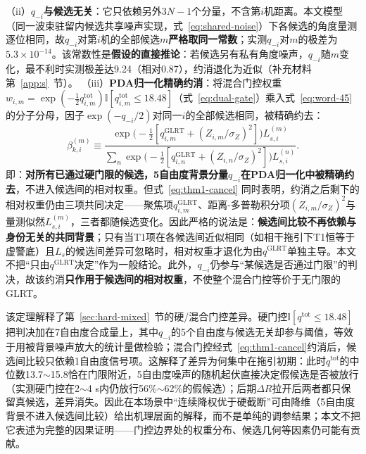 \documentclass[UTF8,a4paper,zihao=-4]{ctexart}
\begin{document}
（ii）\textbf{\(q_{-i}\)与候选无关}：它只依赖另外\(3N-1\)个分量，不含第\(i\)机距离。本文模型（同一波束驻留内候选共享噪声实现，式~\eqref{eq:shared-noise}）下各候选的角度量测逐位相同，故\(q_{-i}\)对第\(i\)机的全部候选\(m\)\textbf{严格取同一常数}；实测\(q_{-i}\)对\(m\)的极差为\(5.3\times10^{-14}\)。该常数性是\textbf{假设的直接推论}：若候选另有私有角度噪声，\(q_{-i}\)随\(m\)变化，最不利时实测极差达9.24（相对0.87），约消退化为近似（补充材料第~\ref{app:s}~节）。
（iii）\textbf{PDA归一化精确约消}：将混合门控权重\(w_{i,m}=\exp(-\tfrac12q^{\mathrm{tot}}_{i,m})\mathbb I[q^{\mathrm{tot}}_{i,m}\le18.48]\)（式~\eqref{eq:dual-gate}）乘入式~\eqref{eq:word-45}的分子分母，因子\(\exp(-q_{-i}/2)\)对同一\(i\)的全部候选相同，被精确约去：
\begin{equation}
\beta_{k,i}^{(m)}\equiv\frac{\exp\!\bigl(-\tfrac12[q^{\mathrm{GLRT}}_{i,m}+(Z_{i,m}/\sigma_Z)^2]\bigr)L_{s,i}^{(m)}}{\sum_{n}\exp\!\bigl(-\tfrac12[q^{\mathrm{GLRT}}_{i,n}+(Z_{i,n}/\sigma_Z)^2]\bigr)L_{s,i}^{(n)}}.
\label{eq:thm1-cancel}
\end{equation}
即：\textbf{对所有已通过硬门限的候选，5自由度背景分量\(q_{-i}\)在PDA归一化中被精确约去}，不进入候选间的相对权重。但式~\eqref{eq:thm1-cancel} 同时表明，约消之后剩下的相对权重仍由三项共同决定——聚焦项\(q^{\mathrm{GLRT}}_{i,m}\)、距离-多普勒积分项\((Z_{i,m}/\sigma_Z)^2\)与量测似然\(L_{s,i}^{(m)}\)，三者都随候选变化。因此严格的说法是：\textbf{候选间比较不再依赖与身份无关的共同背景}；只有当T1项在各候选间近似相同（如相干拖引下T1恒等于虚警底）且\(L_s\)的候选间差异可忽略时，相对权重才退化为由\(q^{\mathrm{GLRT}}\)单独主导。本文不把“只由\(q^{\mathrm{GLRT}}\)决定”作为一般结论。此外，\(q_{-i}\)仍参与“某候选是否通过门限”的判决，故该约消\textbf{只作用于候选间的相对权重}，不使整个混合门控等价于无门限的GLRT。

该定理解释了第~\ref{sec:hard-mixed}~节的硬/混合门控差异。硬门控\(\mathbb I[q^{\mathrm{tot}}\le18.48]\)把判决加在7自由度合成量上，其中\(q_{-i}\)的5个自由度与候选无关却参与阈值，等效于用被背景噪声放大的统计量做检验；混合门控经式~\eqref{eq:thm1-cancel}约消后，候选间比较只依赖1自由度信号项。这解释了差异为何集中在拖引初期：此时\(q^{\mathrm{tot}}\)的中位数13.7\(\sim\)15.8恰在门限附近，5自由度噪声的随机起伏直接决定假候选是否被放行（实测硬门控在2\(\sim\)4 s内仍放行56\%\(\sim\)62\%的假候选）；后期\(\Delta R\)拉开后两者都只保留真候选，差异消失。因此在本场景中“连续降权优于硬截断”可由降维（5自由度背景不进入候选间比较）给出机理层面的解释，而不是单纯的调参结果；本文不把它表述为完整的因果证明——门控边界处的权重分布、候选几何等因素仍可能有贡献。
\end{document}
